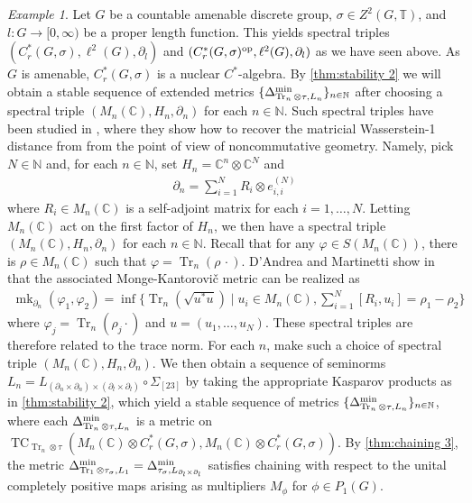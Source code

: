 \documentclass[11pt, a4paper, oneside, final, reqno]{amsart}
\newcommand{\bbN}{\mathbb{N}}
\newcommand{\bbC}{\mathbb{C}}
\newcommand{\bbT}{\mathbb{T}}
\newcommand{\TC}{\operatorname{TC}}
\newcommand{\Tr}{\operatorname{Tr}}
\newcommand{\mk}{\operatorname{mk}}
\newcommand{\Cred}{C^*_r}
\theoremstyle{definition}
\theoremstyle{plain}
\theoremstyle{remark}
\newtheorem{example}[definition]{Example}
\numberwithin{equation}{section}
\begin{document}
\begin{example}\label{example:group-example-chaining-and-stability}
    Let $G$ be a countable amenable discrete group, $\sigma \in Z^2 (G, \bbT)$, and $l \colon G \to [0,\infty)$ be a proper length function. This yields spectral triples $(C^*_r(G,\sigma), \ell^2(G), \partial_l)$ and $(\Cred(G,\sigma)^{\rm op}, \ell^2(G), \partial_l)$ as we have seen above. As $G$ is amenable, $C^*_r (G,\sigma) $ is a nuclear $C^*$-algebra. By \cref{thm:stability 2} we will obtain a stable sequence of extended metrics $\{\Delta_{\Tr_n \otimes \tau, L_n}^{\rm min}\}_{n \in \bbN}$ after choosing a spectral triple $(M_n (\bbC), H_n ,\partial_n)$ for each $n \in \bbN$. Such spectral triples have been studied in \cite{DAndreaMartinetti2021}, where they show how to recover the matricial Wasserstein-1 distance from \cite{ChenGeorgiouNingTannenbaum2017} from the point of view of noncommutative geometry. Namely, pick $N \in \bbN$ and,  for each $n\in \bbN$,  set $H_n = \bbC^n \otimes \bbC^N$ and
    \begin{align*}
        \partial_n = \sum_{i=1}^N R_i \otimes e_{i,i}^{(N)}
    \end{align*}
    where $R_i \in M_n (\bbC)$ is a self-adjoint matrix for each $i = 1, \ldots, N$. Letting $M_n (\bbC)$ act on the first factor of $H_n$, we then have a spectral triple $(M_n(\bbC), H_n, \partial_n)$ for each $n \in \bbN$. Recall that for any $\varphi \in S(M_n (\bbC))$, there is $\rho \in M_n(\bbC)$ such that $\varphi = \Tr_n(\rho\, \cdot)$.  D'Andrea and Martinetti show in \cite[Proposition 5]{DAndreaMartinetti2021} that the associated Monge-Kantorovi\v{c} metric can be realized as
    \begin{align*}
        \mk_{\partial_n}(\varphi_1, \varphi_2) = \inf \big\{  \Tr_n (\sqrt{u^* u} ) \mid u_i \in M_n(\bbC), \sum_{i=1}^N [R_i, u_i] = \rho_1 - \rho_2 \big\}
    \end{align*}
    where $\varphi_j = \Tr_n(\rho_j \cdot )$ and $u = (u_1, \ldots , u_N)$. These spectral triples are therefore related to the trace norm. For each $n$, make such a choice of spectral triple $(M_n(\bbC), H_n, \partial_n)$. We then obtain a sequence of seminorms $L_n = L_{(\partial_n \times \partial_n) \times (\partial_l \times \partial_l)} \circ \Sigma_{[23]}$ by taking the appropriate Kasparov products as in \cref{thm:stability 2}, which yield a stable sequence of metrics $\{\Delta_{\Tr_n \otimes \tau, L_n}^{\rm min}\}_{n \in \bbN}$, where each $\Delta_{\Tr_n \otimes \tau, L_n}^{\rm min}$ is a metric on $\TC_{\Tr_n \otimes \tau}(M_n(\bbC) \otimes C^*_r(G, \sigma), M_n(\bbC) \otimes C^*_r(G, \sigma))$. By  \cref{thm:chaining 3}, the metric $\Delta_{\Tr_1 \otimes \tau_\sigma, L_1}^{\rm min} = \Delta_{\tau_\sigma,L_{\partial_l \times \partial_l}}^{\rm min}$ satisfies chaining with respect to the unital completely positive maps arising as multipliers $M_\phi$ for $\phi \in P_1 (G)$.
\end{example}
\end{document}
